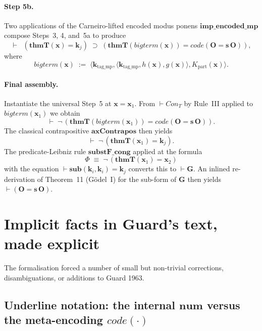 \documentclass[11pt]{article}
\theoremstyle{plain}
\theoremstyle{definition}
\theoremstyle{remark}
\newcommand{\code}[1]{\mathit{code}(#1)}
\newcommand{\sub}{\mathbf{sub}}
\newcommand{\thmT}{\mathbf{thmT}}
\newcommand{\num}{\mathbf{num}}
\newcommand{\seq}[1]{\langle #1 \rangle}
\newcommand{\Con}{\mathit{Con}}
\begin{document}
\paragraph{Step 5b.}  Two applications of the Carneiro-lifted encoded
modus ponens $\mathbf{imp\_encoded\_mp}$ compose Steps~3, 4, and~5a to
produce
\[
\vdash \;\;(\thmT(\mathbf{x}) = \mathbf{k}_j) \;\supset\; (\thmT(\mathit{bigterm}(\mathbf{x})) = \code{\mathbf{O} = \mathbf{s}\,\mathbf{O}}),
\]
where
\[
\mathit{bigterm}(\mathbf{x}) \;:=\; \seq{\mathbf{k}_{\mathrm{tag\_mp}}, \seq{\mathbf{k}_{\mathrm{tag\_mp}}, h(\mathbf{x}), g(\mathbf{x})}, K_{\mathrm{part}}(\mathbf{x})}.
\]

\paragraph{Final assembly.}  Instantiate the universal Step~5 at
$\mathbf{x} = \mathbf{x}_1$.  From $\vdash \Con_T$ by Rule~III applied
to $\mathit{bigterm}(\mathbf{x}_1)$ we obtain
\[
\vdash \;\neg\,(\thmT(\mathit{bigterm}(\mathbf{x}_1)) = \code{\mathbf{O} = \mathbf{s}\,\mathbf{O}}).
\]
The classical contrapositive $\mathbf{axContrapos}$ then yields
\[
\vdash \;\neg\,(\thmT(\mathbf{x}_1) = \mathbf{k}_j).
\]
The predicate-Leibniz rule $\mathbf{substF\_cong}$ applied at the
formula
\[
\Phi \;\equiv\; \neg\,(\thmT(\mathbf{x}_1) = \mathbf{x}_2)
\]
with the equation $\vdash \sub(\mathbf{k}_i, \mathbf{k}_i) = \mathbf{k}_j$
converts this to $\vdash \mathbf{G}$.  An inlined re-derivation of
Theorem~11 (G\"odel~I) for the sub-form of $\mathbf{G}$ then yields
$\vdash (\mathbf{O} = \mathbf{s}\,\mathbf{O})$.

\section{Implicit facts in Guard's text, made explicit}

The formalisation forced a number of small but non-trivial corrections,
disambiguations, or additions to Guard 1963.

\subsection{Underline notation: the internal $\num$ versus the meta-encoding $\code{\cdot}$}
\end{document}
